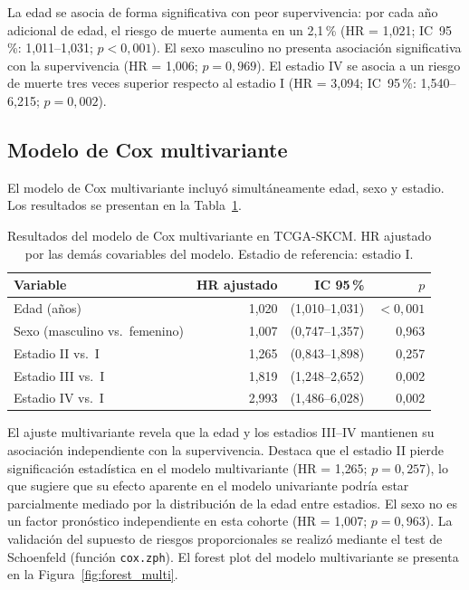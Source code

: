 La edad se asocia de forma significativa con peor supervivencia: por cada año adicional de edad, el riesgo de muerte aumenta en un 2,1\,\% (HR = 1{,}021; IC~95\,\%: 1{,}011--1{,}031; $p < 0{,}001$). El sexo masculino no presenta asociación significativa con la supervivencia (HR = 1{,}006; $p = 0{,}969$). El estadio IV se asocia a un riesgo de muerte tres veces superior respecto al estadio I (HR = 3{,}094; IC~95\,\%: 1{,}540--6{,}215; $p = 0{,}002$).

\subsection{Modelo de Cox multivariante}

El modelo de Cox multivariante incluyó simultáneamente edad, sexo y estadio. Los resultados se presentan en la Tabla~\ref{tab:cox_multivariante_tcga}.

\begin{table}[H]
\centering
\caption{Resultados del modelo de Cox multivariante en TCGA-SKCM. HR ajustado por las demás covariables del modelo. Estadio de referencia: estadio I.}
\label{tab:cox_multivariante_tcga}
\begin{tabularx}{\textwidth}{l r r r}
\toprule
Variable & HR ajustado & IC 95\,\% & $p$ \\
\midrule
Edad (años) & 1,020 & (1,010--1,031) & $<0{,}001$ \\
Sexo (masculino vs.\ femenino) & 1,007 & (0,747--1,357) & 0,963 \\
Estadio II vs.\ I & 1,265 & (0,843--1,898) & 0,257 \\
Estadio III vs.\ I & 1,819 & (1,248--2,652) & 0,002 \\
Estadio IV vs.\ I & 2,993 & (1,486--6,028) & 0,002 \\
\bottomrule
\end{tabularx}
\end{table}

El ajuste multivariante revela que la edad y los estadios III--IV mantienen su asociación independiente con la supervivencia. Destaca que el estadio II pierde significación estadística en el modelo multivariante (HR = 1{,}265; $p = 0{,}257$), lo que sugiere que su efecto aparente en el modelo univariante podría estar parcialmente mediado por la distribución de la edad entre estadios. El sexo no es un factor pronóstico independiente en esta cohorte (HR = 1{,}007; $p = 0{,}963$). La validación del supuesto de riesgos proporcionales se realizó mediante el test de Schoenfeld (función \texttt{cox.zph}). El forest plot del modelo multivariante se presenta en la Figura~\ref{fig:forest_multi}.

